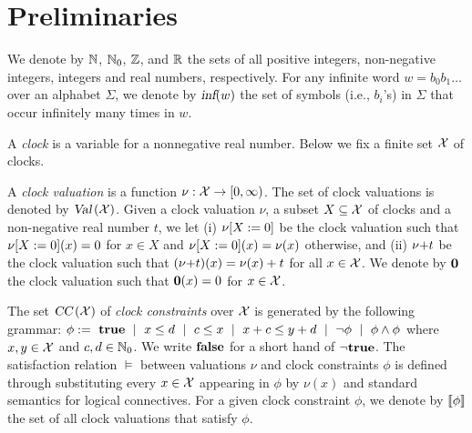 \vspace{-1.5em}
\section{Preliminaries}
\vspace{-1em}

We denote by $\mathbb{N}$, $\mathbb{N}_0$, $\mathbb{Z}$, and $\mathbb{R}$ the sets of all positive
integers, non-negative integers, integers and real numbers, respectively.
For any infinite word $w=b_0b_1\dots$ over an alphabet $\Sigma$, we denote by $\mbox{\sl inf} ( w )$ the set of symbols (i.e., $b_i$'s) in $\Sigma$ that occur infinitely many times in $w$.

%
%
A \emph{clock} is a variable for a nonnegative real number. Below we fix a finite set $\mathcal{X}$ of clocks.

\smallskip {}
A \emph{clock valuation} is a function $\nu:\mathcal{X}\rightarrow [0,\infty)$. The set of clock valuations
is denoted by $\mbox{\sl Val}\left(\mathcal{X}\right)$.
Given a clock valuation $\nu$, a subset $X\subseteq\mathcal{X}$ of clocks and a non-negative real number $t$, we let (i) ${\nu}{\left[X:=0\right]}$ be the clock valuation such that ${\nu}{\left[X:=0\right]}(x)=0$ for $x\in X$ and ${\nu}{\left[X:=0\right]}(x)=\nu(x)$ otherwise, and (ii) ${\nu}{+}{t}$ be the clock valuation such that $({\nu}{+}{t})(x)=\nu(x)+t$ for all $x\in\mathcal{X}$.
We denote by $\mathbf{0}$ the clock valuation such that $\mathbf{0}(x)=0$ for $x\in\mathcal{X}$.

\smallskip {} The set $\mbox{\sl CC}\left(\mathcal{X}\right)$ of \emph{clock constraints}  over $\mathcal{X}$ is generated by the following grammar:
$
\phi:=~\mathbf{true}~\mid~x\le d~\mid ~c\le x~\mid~x+c\le y+d~\mid ~\neg\phi~\mid~\phi\wedge\phi
$
where $x,y\in\mathcal{X}$ and $c,d\in\mathbb{N}_0$.
We write $\mathbf{false}$ for a short hand of $\neg\mathbf{true}$.
The satisfaction relation $\models$ between valuations $\nu$ and clock constraints $\phi$ is defined through substituting every $x\in\mathcal{X}$ appearing in $\phi$ by $\nu(x)$ and standard semantics for logical connectives.
For a given clock constraint $\phi$, we denote by ${\llbracket}{\phi}{\rrbracket}$ the set of all clock valuations that satisfy $\phi$.

